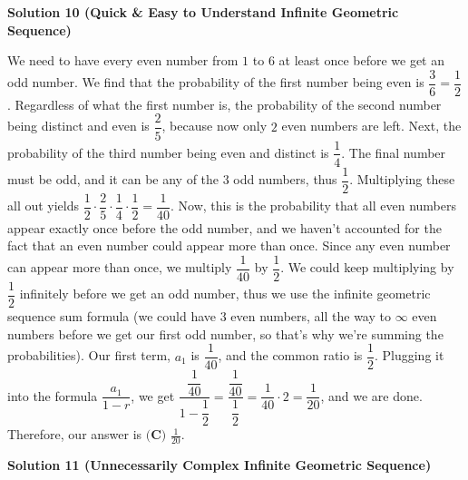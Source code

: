 \begin{enumerate}
\textbf{Solution 10 (Quick & Easy to Understand Infinite Geometric Sequence)}

We need to have every even number from $1$ to $6$ at least once before we get an odd number. We find that the probability of the first number being even is $\dfrac{3}{6} = \dfrac{1}{2}$. Regardless of what the first number is, the probability of the second number being distinct and even is $\dfrac{2}{5}$, because now only $2$ even numbers are left. Next, the probability of the third number being even and distinct is $\dfrac{1}{4}$. The final number must be odd, and it can be any of the $3$ odd numbers, thus $\dfrac{1}{2}$. Multiplying these all out yields $\dfrac{1}{2} \cdot \dfrac{2}{5} \cdot \dfrac{1}{4} \cdot \dfrac{1}{2} = \dfrac{1}{40}$. Now, this is the probability that all even numbers appear exactly once before the odd number, and we haven't accounted for the fact that an even number could appear more than once. Since any even number can appear more than once, we multiply $\dfrac{1}{40}$ by $\dfrac{1}{2}$. We could keep multiplying by $\dfrac{1}{2}$ infinitely before we get an odd number, thus we use the infinite geometric sequence sum formula (we could have $3$ even numbers, all the way to $\infty$ even numbers before we get our first odd number, so that's why we're summing the probabilities). Our first term, $a_1$ is $\dfrac{1}{40}$, and the common ratio is $\dfrac{1}{2}$. Plugging it into the formula $\dfrac{a_1}{1-r}$, we get $\dfrac{\dfrac{1}{40}}{1-\dfrac{1}{2}} = \dfrac{\dfrac{1}{40}}{\dfrac{1}{2}} = \dfrac{1}{40} \cdot 2 = \dfrac{1}{20}$, and we are done. Therefore, our answer is $\boxed{\textbf{(C) }\frac{1}{20}.}$




\textbf{Solution 11 (Unnecessarily Complex Infinite Geometric Sequence)}


\end{enumerate}
